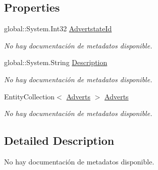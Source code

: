 \subsection*{Properties}
\begin{DoxyCompactItemize}
\item 
global\-::\-System.\-Int32 \hyperlink{class_game_memory_1_1_advert_states_a4fc6f03f0b82dcc6f7bec119f78ac16c}{Advertstate\-Id}
\begin{DoxyCompactList}\small\item\em No hay documentación de metadatos disponible. \end{DoxyCompactList}\item 
global\-::\-System.\-String \hyperlink{class_game_memory_1_1_advert_states_af1d9170e4f56ed8db771b2f28bfa3307}{Description}
\begin{DoxyCompactList}\small\item\em No hay documentación de metadatos disponible. \end{DoxyCompactList}\item 
Entity\-Collection$<$ \hyperlink{class_game_memory_1_1_adverts}{Adverts} $>$ \hyperlink{class_game_memory_1_1_advert_states_a67a482fee6ab0b3af3e41c91b33f263c}{Adverts}
\begin{DoxyCompactList}\small\item\em No hay documentación de metadatos disponible. \end{DoxyCompactList}\end{DoxyCompactItemize}


\subsection{Detailed Description}
No hay documentación de metadatos disponible. 



